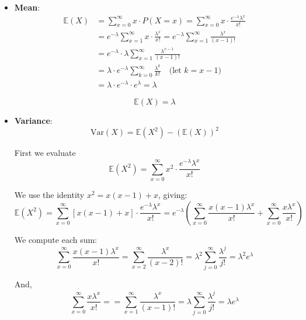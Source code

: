 \documentclass[twoside]{book}
\begin{document}
\begin{itemize}
    \item \textbf{Mean}:
    \begin{align*}
\mathbb{E}(X) &= \sum_{x=0}^{\infty} x \cdot P(X = x) = \sum_{x=0}^{\infty} x \cdot \frac{e^{-\lambda} \lambda^x}{x!} \\
&= e^{-\lambda} \sum_{x=1}^{\infty} x \cdot \frac{\lambda^x}{x!} = e^{-\lambda} \sum_{x=1}^{\infty} \frac{\lambda^x}{(x-1)!} \\
&= e^{-\lambda} \cdot \lambda \sum_{x=1}^{\infty} \frac{\lambda^{x-1}}{(x-1)!} \\
&= \lambda \cdot e^{-\lambda} \sum_{k=0}^{\infty} \frac{\lambda^k}{k!} \quad \text{(let } k = x - 1 \text{)} \\
&= \lambda \cdot e^{-\lambda} \cdot e^{\lambda} = \lambda
\end{align*}

    \begin{textbox}
        \[
    \mathbb{E}(X) = \lambda
    \]
    \end{textbox}

    \item \textbf{Variance}:
    \[
    \text{Var}(X) = \mathbb{E}(X^2) - (\mathbb{E}(X))^2
    \]

    First we evaluate
\[
\mathbb{E}(X^2) = \sum_{x=0}^{\infty} x^2 \cdot \frac{e^{-\lambda} \lambda^x}{x!}
\]

We use the identity \(x^2 = x(x - 1) + x\), giving:
\[
\mathbb{E}(X^2) = \sum_{x=0}^{\infty} \left[x(x - 1) + x\right] \cdot \frac{e^{-\lambda} \lambda^x}{x!}
= e^{-\lambda} \left( \sum_{x=0}^{\infty} \frac{x(x-1) \lambda^x}{x!} + \sum_{x=0}^{\infty} \frac{x \lambda^x}{x!} \right)
\]

We compute each sum:
\[
\sum_{x=0}^{\infty} \frac{x(x-1) \lambda^x}{x!} =\sum_{x=2}^{\infty} \frac{\lambda^x}{(x-2)!}=\lambda^2\sum_{j=0}^{\infty} \frac{\lambda^j}{j!} =\lambda^2 e^{\lambda}
\]

And,
$$\sum_{x=0}^{\infty} \frac{x \lambda^x}{x!} = =\sum_{x=1}^{\infty} \frac{\lambda^x}{(x-1)!}=\lambda\sum_{j=0}^{\infty} \frac{\lambda^j}{j!} =\lambda e^{\lambda}$$


\end{itemize}
\end{document}
